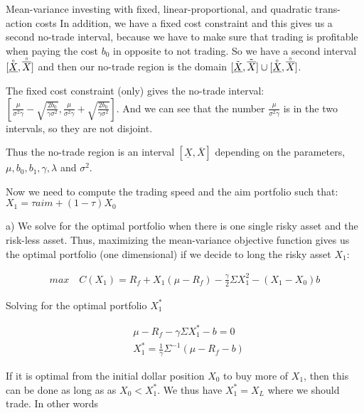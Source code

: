 \documentclass[10pt]{article}
\newenvironment{exercise}[2][Exercise]{\begin{trivlist}
  \item[\hskip \labelsep {\bfseries #1}\hskip \labelsep {\bfseries #2.}]}{\end{trivlist}}
\begin{document}
\begin{exercise}{1}{Mean-variance investing with fixed, linear-proportional, and quadratic trans- action costs}
  In addition, we have a fixed cost constraint and this gives us a second no-trade interval, because we have to make sure that trading is profitable when paying the cost $b_0$ in opposite to not trading. So we have a second interval $[\accentset{\circ}{\underline{X}},\accentset{\circ}{\overline{X}}]$ and then our no-trade region is the domain $ [\tilde{\underline{X}},\tilde{\overline{X}}]\cup [\accentset{\circ}{\underline{X}},\accentset{\circ}{\overline{X}}]$. 

  The fixed cost constraint (only) gives the no-trade interval: $[\frac{\mu}{\sigma^2\gamma} -\sqrt{\frac{2b_0}{\gamma\sigma^2}},\frac{\mu}{\sigma^2\gamma} +\sqrt{\frac{2b_0}{\gamma\sigma^2}}]$. And we can see that the number $\frac{\mu}{\sigma^2\gamma}$ is in the two intervals, so they are not disjoint. 
  
  Thus the no-trade region is an interval $[\underline{X},\overline{X}]$ depending on the parameters, $\mu, b_0, b_1,\gamma, \lambda$ and $\sigma^2$. 

  Now we need to compute the trading speed and the aim portfolio such that: $X_1 = \tau aim + (1-\tau)X_0$

\end{exercise}

\newpage

\begin{exercise}{2}
\end{exercise}

a) We solve for the optimal portfolio when there is one single risky asset and the risk-less asset. Thus, maximizing the mean-variance objective function gives us the optimal portfolio (one dimensional) if we decide to long the risky asset $X_1$:

\begin{align*}
	max \quad C(X_1) = R_f + X_1(\mu - R_f) - \frac{\gamma}{2} \Sigma X_1^2 - (X_1 - X_0)b
\end{align*}

Solving for the optimal portfolio $X_1^*$ 

\begin{align*}
	& \mu - R_f - \gamma \Sigma X_1^* - b = 0 \\
	& X_1^* = \frac{1}{\gamma} \Sigma^{-1} (\mu - R_f  - b)
\end{align*}

If it is optimal from the initial dollar position $X_0$ to buy more of $X_1$, then this can be done as long as as $X_0 < X_1^*$. We thus have $X_1^* = X_L$ where we should trade. In other words
\end{document}
